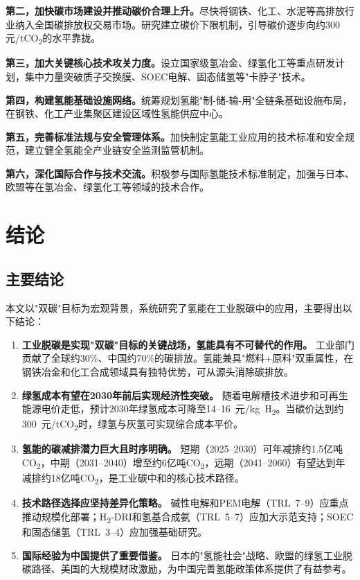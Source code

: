 \documentclass[12pt,a4paper]{ctexart}
\newcommand{\COO}{CO\textsubscript{2}}
\begin{document}
\textbf{第二，加快碳市场建设并推动碳价合理上升。}尽快将钢铁、化工、水泥等高排放行业纳入全国碳排放权交易市场。研究建立碳价下限机制，引导碳价逐步向约300元/t\COO 的水平靠拢。

\textbf{第三，加大关键核心技术攻关力度。}设立国家级氢冶金、绿氢化工等重点研发计划，集中力量突破质子交换膜、SOEC电解、固态储氢等"卡脖子"技术。

\textbf{第四，构建氢能基础设施网络。}统筹规划氢能"制-储-输-用"全链条基础设施布局，在钢铁、化工产业集聚区建设区域性氢能供应中心。

\textbf{第五，完善标准法规与安全管理体系。}加快制定氢能工业应用的技术标准和安全规范，建立健全氢能全产业链安全监测监管机制。

\textbf{第六，深化国际合作与技术交流。}积极参与国际氢能技术标准制定，加强与日本、欧盟等在氢冶金、绿氢化工等领域的技术合作\cite{zhang2021}。
\section{结论}
\subsection{主要结论}

本文以"双碳"目标为宏观背景，系统研究了氢能在工业脱碳中的应用，主要得出以下结论：

\begin{enumerate}[label=(\arabic*)]
    \item \textbf{工业脱碳是实现"双碳"目标的关键战场，氢能具有不可替代的作用。}
        工业部门贡献了全球约30\%、中国约70\%的碳排放。氢能兼具"燃料+原料"双重属性，在钢铁冶金和化工合成领域具有独特优势，可从源头消除碳排放。

    \item \textbf{绿氢成本有望在2030年前后实现经济性突破。}
        随着电解槽技术进步和可再生能源电价走低，预计2030年绿氢成本可降至14--16~元/kg~H\textsubscript{2}。当碳价达到约300~元/t\COO 时，绿氢与灰氢可实现综合成本平价。

    \item \textbf{氢能的碳减排潜力巨大且时序明确。}
        短期（2025--2030）可年减排约1.5亿吨\COO ，中期（2031--2040）增至约6亿吨\COO ，远期（2041--2060）有望达到年减排约18亿吨\COO ，是工业碳中和的核心技术路径。

    \item \textbf{技术路径选择应坚持差异化策略。}
        碱性电解和PEM电解（TRL~7--9）应重点推动规模化部署；H\textsubscript{2}-DRI和氢基合成氨（TRL~5--7）应加大示范支持；SOEC和固态储氢（TRL~3--4）应加强基础研究。

    \item \textbf{国际经验为中国提供了重要借鉴。}
        日本的"氢能社会"战略、欧盟的绿氢工业脱碳路径、美国的大规模财政激励，为中国完善氢能政策体系提供了有益参考。
\end{enumerate}
\end{document}
